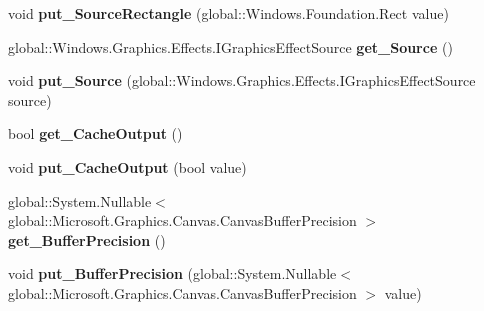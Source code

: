 \begin{DoxyCompactItemize}
\mbox{\label{class_microsoft_1_1_graphics_1_1_canvas_1_1_effects_1_1_tile_effect_a1a2a8a43669447290f1788aeafe2a795}} 
void {\bfseries put\+\_\+\+Source\+Rectangle} (global\+::\+Windows.\+Foundation.\+Rect value)
\item 
\mbox{\label{class_microsoft_1_1_graphics_1_1_canvas_1_1_effects_1_1_tile_effect_a7915c13a5ebe9c3c5289e7a8098f8c6a}} 
global\+::\+Windows.\+Graphics.\+Effects.\+I\+Graphics\+Effect\+Source {\bfseries get\+\_\+\+Source} ()
\item 
\mbox{\label{class_microsoft_1_1_graphics_1_1_canvas_1_1_effects_1_1_tile_effect_aba6942fe8fd59d19eb6ae826d403ca0a}} 
void {\bfseries put\+\_\+\+Source} (global\+::\+Windows.\+Graphics.\+Effects.\+I\+Graphics\+Effect\+Source source)
\item 
\mbox{\label{class_microsoft_1_1_graphics_1_1_canvas_1_1_effects_1_1_tile_effect_a34471e14ce7781b362ff9a33095823d1}} 
bool {\bfseries get\+\_\+\+Cache\+Output} ()
\item 
\mbox{\label{class_microsoft_1_1_graphics_1_1_canvas_1_1_effects_1_1_tile_effect_a0939a2d0898392b5bdc2e982fbeb6bb1}} 
void {\bfseries put\+\_\+\+Cache\+Output} (bool value)
\item 
\mbox{\label{class_microsoft_1_1_graphics_1_1_canvas_1_1_effects_1_1_tile_effect_aada4294bc238ad104a96e172d5ff1ab5}} 
global\+::\+System.\+Nullable$<$ global\+::\+Microsoft.\+Graphics.\+Canvas.\+Canvas\+Buffer\+Precision $>$ {\bfseries get\+\_\+\+Buffer\+Precision} ()
\item 
\mbox{\label{class_microsoft_1_1_graphics_1_1_canvas_1_1_effects_1_1_tile_effect_afa22a63ba8c4a8a57d6b8faeaa37c1db}} 
void {\bfseries put\+\_\+\+Buffer\+Precision} (global\+::\+System.\+Nullable$<$ global\+::\+Microsoft.\+Graphics.\+Canvas.\+Canvas\+Buffer\+Precision $>$ value)

\end{DoxyCompactItemize}
